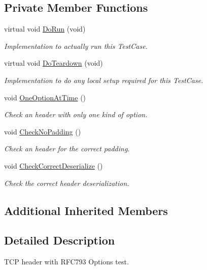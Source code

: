 \subsection*{Private Member Functions}
\begin{DoxyCompactItemize}
\item 
virtual void \hyperlink{classTcpHeaderWithRFC793OptionTestCase_a52dc5f29802269d2d160f897a7933406}{Do\+Run} (void)
\begin{DoxyCompactList}\small\item\em Implementation to actually run this Test\+Case. \end{DoxyCompactList}\item 
virtual void \hyperlink{classTcpHeaderWithRFC793OptionTestCase_ad6f03b24157de8969826eeebf3ad4111}{Do\+Teardown} (void)
\begin{DoxyCompactList}\small\item\em Implementation to do any local setup required for this Test\+Case. \end{DoxyCompactList}\item 
void \hyperlink{classTcpHeaderWithRFC793OptionTestCase_a4f736353f198886b49418a84756e48de}{One\+Option\+At\+Time} ()
\begin{DoxyCompactList}\small\item\em Check an header with only one kind of option. \end{DoxyCompactList}\item 
void \hyperlink{classTcpHeaderWithRFC793OptionTestCase_ac054655b0adbd8c76eab91590eb246c4}{Check\+No\+Padding} ()
\begin{DoxyCompactList}\small\item\em Check an header for the correct padding. \end{DoxyCompactList}\item 
void \hyperlink{classTcpHeaderWithRFC793OptionTestCase_ad8478f3d6d33caa92f933389f8d8419b}{Check\+Correct\+Deserialize} ()
\begin{DoxyCompactList}\small\item\em Check the correct header deserialization. \end{DoxyCompactList}\end{DoxyCompactItemize}
\subsection*{Additional Inherited Members}


\subsection{Detailed Description}
T\+CP header with R\+F\+C793 Options test. 

